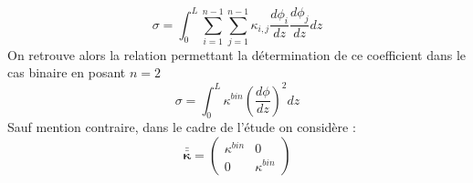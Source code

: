 \begin{equation}
\sigma = \int_0^L \sum_{i=1}^{n-1}\sum_{j=1}^{n-1} \kappa_{i,j}\frac{d\phi_i}{dz}\frac{d\phi_j}{dz}dz
\end{equation}
On retrouve alors la relation permettant la détermination de ce coefficient dans le cas binaire en posant $n=2$
\begin{equation}
\sigma = \int_0^L\kappa^{bin}\left(\frac{d\phi}{dz}\right)^2dz
\end{equation}
Sauf mention contraire, dans le cadre de l'étude on considère :
\begin{equation}
\bm{\bar{\bar{\kappa}}} =    \begin{pmatrix} 
\kappa^{bin}& 0 \\ 
0				& \kappa^{bin} 
\end{pmatrix} 
\end{equation}
